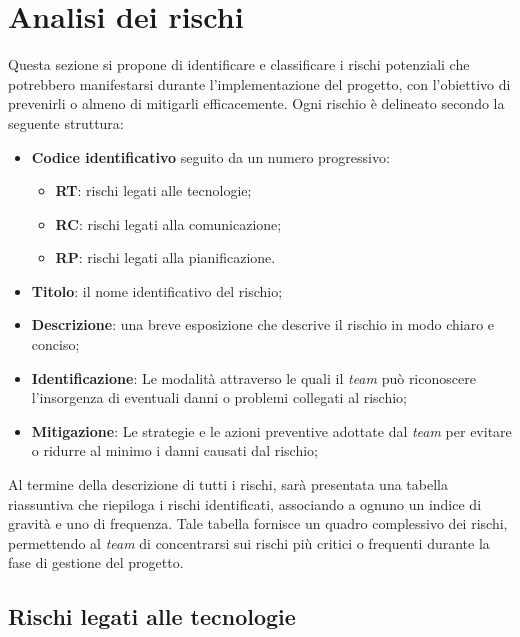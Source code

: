 \section{Analisi dei rischi}

Questa sezione si propone di identificare e classificare i rischi potenziali 
che potrebbero manifestarsi durante l'implementazione del progetto, 
con l'obiettivo di prevenirli o almeno di mitigarli efficacemente. 
Ogni rischio è delineato secondo la seguente struttura:
\begin{itemize}
	\item \textbf{Codice identificativo} seguito da un numero progressivo:
	      \begin{itemize}
		      \item \textbf{RT}: rischi legati alle tecnologie;
		      \item \textbf{RC}: rischi legati alla comunicazione;
		      \item \textbf{RP}: rischi legati alla pianificazione.
	      \end{itemize}

	\item \textbf{Titolo}: il nome identificativo del rischio;

	\item \textbf{Descrizione}: una breve esposizione che descrive il rischio in modo chiaro e conciso;

	\item \textbf{Identificazione}: Le modalità attraverso le quali il \textit{team} può riconoscere 
		l'insorgenza di eventuali danni o problemi collegati al rischio;

	\item \textbf{Mitigazione}: Le strategie e le azioni preventive adottate dal 
		\textit{team} per evitare o ridurre al minimo i danni causati dal rischio;
\end{itemize}

Al termine della descrizione di tutti i rischi, sarà presentata una tabella riassuntiva 
che riepiloga i rischi identificati, associando a ognuno un indice di gravità e uno di frequenza. 
Tale tabella fornisce un quadro complessivo dei rischi, 
permettendo al \textit{team} di concentrarsi sui rischi più critici o 
frequenti durante la fase di gestione del progetto.


\subsection{Rischi legati alle tecnologie}







